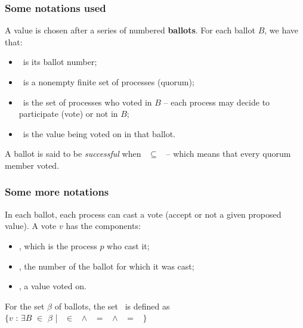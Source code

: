 \documentclass[10 pt]{beamer}
\begin{document}
\begin{frame}
  \frametitle{Some notations used}
  
  A value is chosen after a series of numbered \textbf{ballots}. For each ballot $B$, we have that:
  \begin{itemize}
    \item \bbal\ is its ballot number; %
    \item \bqrm\ is a nonempty finite set of processes (quorum);
    \item \bvot\ is the set of processes who voted in $B$ -- each process may decide to participate (vote) or not in $B$;
    \item \bval\ is the value being voted on in that ballot.
  \end{itemize}
  
  \vspace{4 mm}
  A ballot is said to be \emph{successful} when \bqrm\ $\subseteq$ \bvot\ -- which means that every quorum member voted.

\end{frame}

\begin{frame}
  \frametitle{Some more notations}
  
  In each ballot, each process can cast a vote (accept or not a given proposed value). A vote $v$ has the components:

  \begin{itemize}
    \item \vp, which is the process $p$ who cast it;
    \item \vbal, the number of the ballot for which it was cast;
    \item \vval, a value voted on.
  \end{itemize}
  
  \vspace{4 mm}
 For the set $\beta$ of ballots, the set \votesbeta\ is defined as\\
 $\{v$ : $\exists B$ $\in$ $\beta$ | \vp\ $\in$ \bvot\ $\wedge$ \vbal\ $=$ \bbal\ $\wedge$ \vval\ $=$ \bval\ $\}$ 

\end{frame}
\end{document}
